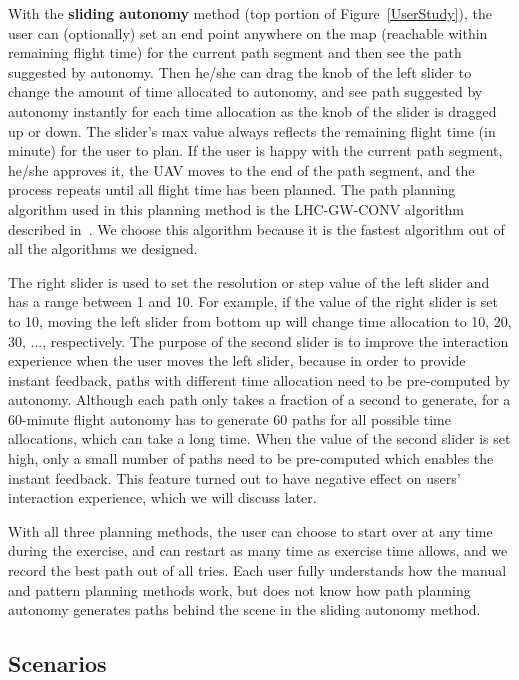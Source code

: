 \documentclass[lettersize, apacite, twoside, HRI]{apa_HRI}
\begin{document}
With the \textbf{sliding autonomy} method (top portion of Figure~\ref{UserStudy}), the user can (optionally) set an end point anywhere on the map (reachable within remaining flight time) for the current path segment and then see the path suggested by autonomy. Then he/she can drag the knob of the left slider to change the amount of time allocated to autonomy, and see path suggested by autonomy instantly for each time allocation as the knob of the slider is dragged up or down. The slider's max value always reflects the remaining flight time (in minute) for the user to plan. If the user is happy with the current path segment, he/she approves it, the UAV moves to the end of the path segment, and the process repeats until all flight time has been planned. The path planning algorithm used in this planning method is the LHC-GW-CONV algorithm described in~\cite{Lin2009UAV, Lin2014Hierarchical}. We choose this algorithm because it is the fastest algorithm out of all the algorithms we designed.

The right slider is used to set the resolution or step value of the left slider and has a range between 1 and 10. For example, if the value of the right slider is set to 10, moving the left slider from bottom up will change time allocation to 10, 20, 30, ..., respectively. The purpose of the second slider is to improve the interaction experience when the user moves the left slider, because in order to provide instant feedback, paths with different time allocation need to be pre-computed by autonomy. Although each path only takes a fraction of a second to generate, for a 60-minute flight autonomy has to generate 60 paths for all possible time allocations, which can take a long time. When the value of the second slider is set high, only a small number of paths need to be pre-computed which enables the instant feedback. This feature turned out to have negative effect on users' interaction experience, which we will discuss later.

With all three planning methods, the user can choose to start over at any time during the exercise, and can restart as many time as exercise time allows, and we record the best path out of all tries. Each user fully understands how the manual and pattern planning methods work, but does not know how path planning autonomy generates paths behind the scene in the sliding autonomy method.

\subsection{Scenarios}
\end{document}
